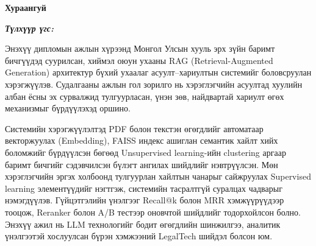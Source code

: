 

\begin{center}
{\scshape\Large \univname\par} %
{\scshape\large \facname\par}\vspace{0.5cm} %
{\huge\textbf{{Хураангуй}} \par}
\bigskip
{\Large{\ttitle} \par} %
\bigskip

{\normalsize \shortname \par} %
\addressname
\end{center}

\textit{\textbf{Түлхүүр үгс: \keywordnames}}
\bigskip


Энэхүү дипломын ажлын хүрээнд Монгол Улсын хууль эрх зүйн баримт бичгүүдэд суурилсан, хиймэл оюун ухааны RAG (Retrieval-Augmented Generation) архитектур бүхий ухаалаг асуулт–хариултын системийг боловсруулан хэрэгжүүлэв. Судалгааны ажлын гол зорилго нь хэрэглэгчийн асуултад хуулийн албан ёсны эх сурвалжид тулгуурласан, үнэн зөв, найдвартай хариулт өгөх механизмыг бүрдүүлэхэд оршино.

Системийн хэрэгжүүлэлтэд PDF болон текстэн өгөгдлийг автоматаар векторжуулах (Embedding), FAISS индекс ашиглан семантик хайлт хийх боломжийг бүрдүүлсэн бөгөөд Unsupervised learning-ийн clustering аргаар баримт бичгийг сэдэвчилсэн бүлэгт ангилах шийдлийг нэвтрүүлсэн. Мөн хэрэглэгчийн эргэх холбоонд тулгуурлан хайлтын чанарыг сайжруулах Supervised learning элементүүдийг нэгтгэж, системийн тасралтгүй суралцах чадварыг нэмэгдүүлэв. Гүйцэтгэлийн үнэлгээг Recall@k болон MRR хэмжүүрүүдээр тооцож, Reranker болон A/B тестээр оновчтой шийдлийг тодорхойлсон болно. Энэхүү ажил нь LLM технологийг бодит өгөгдлийн шинжилгээ, аналитик үнэлгээтэй хослуулсан бүрэн хэмжээний LegalTech шийдэл болсон юм.



